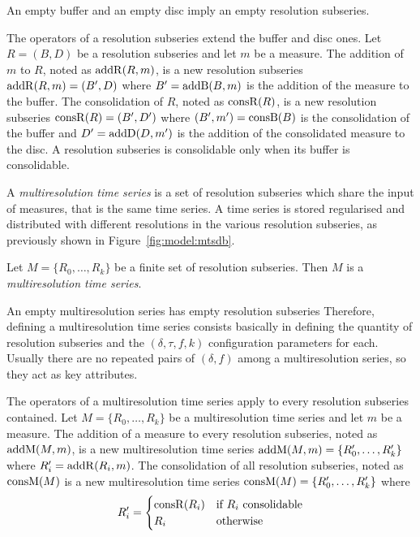 An empty buffer and an empty disc imply an empty resolution subseries. 


The operators of a resolution subseries extend the buffer and disc
ones. Let $R=(B,D)$ be a resolution subseries and let $m$ be a
measure.  The addition of $m$ to $R$, noted as $\operatorname{addR}(R,m)$, is a new
resolution subseries $\operatorname{addR}(R,m)=(B',D)$ where $B'= \operatorname{addB}(B,m)$ is the
addition of the measure to the buffer.  The consolidation of $R$,
noted as $\operatorname{consR}(R)$, is a new resolution subseries
$\operatorname{consR}(R)=(B',D')$ where $(B',m') = \operatorname{consB}(B)$ is the consolidation
of the buffer and $D'= \operatorname{addD}(D,m')$ is the addition of the
consolidated measure to the disc. A resolution subseries is
consolidable only when its buffer is consolidable.




A \emph{multiresolution time series} is a set of resolution subseries
which share the input of measures, that is the same time series. A
time series is stored regularised and distributed with different
resolutions in the various resolution subseries, as previously shown
in Figure~\ref{fig:model:mtsdb}.
\begin{definition}%
  Let $M=\{R_0, \dots, R_k\}$ be a finite set of resolution
  subseries. Then $M$ is a \emph{multiresolution time series}.
\end{definition}


An empty multiresolution series has empty resolution subseries
Therefore, defining a multiresolution time series consists basically
in defining the quantity of resolution subseries and the
$(\delta,\tau,f,k)$ configuration parameters for each.  Usually there
are no repeated pairs of $(\delta,f)$ among a multiresolution
series, so they act as  key attributes.



The operators of a multiresolution time series apply to every
resolution subseries contained. Let $M=\{R_0,\allowbreak
\dots,\allowbreak R_k\}$ be a multiresolution time series and let $m$
be a measure.
%
The addition of a measure to every resolution subseries, noted as
$\operatorname{addM}(M,m)$, is a new multiresolution time series $\operatorname{addM}(M,m)=\{R'_0,
\dots,\allowbreak R'_k\}$ where $R'_i=\operatorname{addR}(R_i,m)$. The consolidation
of all resolution subseries, noted as $\operatorname{consM}(M)$ is a new
multiresolution time series $\operatorname{consM}(M)=\{R'_0,\allowbreak
\dots,\allowbreak R'_k\}$ where 
\[R'_i=
\begin{cases}
\operatorname{consR}(R_i) & \text{if } R_i \text{ consolidable}\\
 R_i & \text{otherwise}
\end{cases}
\]

